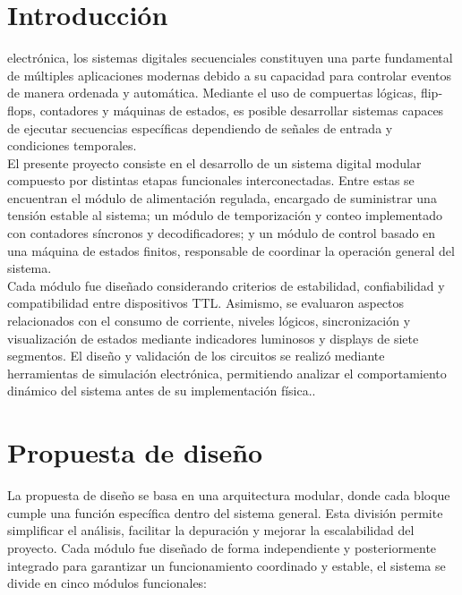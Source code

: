 \documentclass[journal]{IEEEtran}
\begin{document}
\section{Introducción}

 electrónica, los sistemas digitales secuenciales constituyen una parte fundamental de múltiples aplicaciones modernas debido a su capacidad para controlar eventos de manera ordenada y automática. Mediante el uso de compuertas lógicas, flip-flops, contadores y máquinas de estados, es posible desarrollar sistemas capaces de ejecutar secuencias específicas dependiendo de señales de entrada y condiciones temporales. \\

El presente proyecto consiste en el desarrollo de un sistema digital modular compuesto por distintas etapas funcionales interconectadas. Entre estas se encuentran el módulo de alimentación regulada, encargado de suministrar una tensión estable al sistema; un módulo de temporización y conteo implementado con contadores síncronos y decodificadores; y un módulo de control basado en una máquina de estados finitos, responsable de coordinar la operación general del sistema.\\

Cada módulo fue diseñado considerando criterios de estabilidad, confiabilidad y compatibilidad entre dispositivos TTL. Asimismo, se evaluaron aspectos relacionados con el consumo de corriente, niveles lógicos, sincronización y visualización de estados mediante indicadores luminosos y displays de siete segmentos. El diseño y validación de los circuitos se realizó mediante herramientas de simulación electrónica, permitiendo analizar el comportamiento dinámico del sistema antes de su implementación física..


\section{Propuesta de diseño}

La propuesta de diseño se basa en una arquitectura modular, donde cada bloque cumple una función específica dentro del sistema general. Esta división permite simplificar el análisis, facilitar la depuración y mejorar la escalabilidad del proyecto. Cada módulo fue diseñado de forma independiente y posteriormente integrado para garantizar un funcionamiento coordinado y estable, el sistema se divide en cinco módulos funcionales: \\
\end{document}
